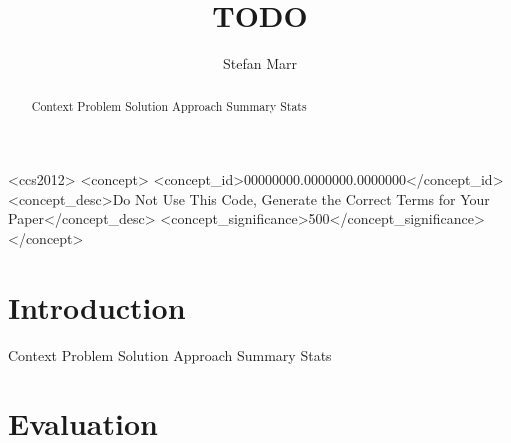 \documentclass[acmsmall,screen]{acmart}
\begin{document}
\title{TODO}

\author{Stefan Marr}


\begin{abstract}
\begin{note}
  Context
  Problem
  Solution Approach
  Summary Stats
\end{note}
\end{abstract}

\begin{CCSXML}
<ccs2012>
 <concept>
  <concept_id>00000000.0000000.0000000</concept_id>
  <concept_desc>Do Not Use This Code, Generate the Correct Terms for Your Paper</concept_desc>
  <concept_significance>500</concept_significance>
 </concept>
\end{CCSXML}




\maketitle

\section{Introduction}
\begin{note}
  Context
  Problem
  Solution Approach
  Summary Stats
\end{note}




\section{Evaluation}
\end{document}
